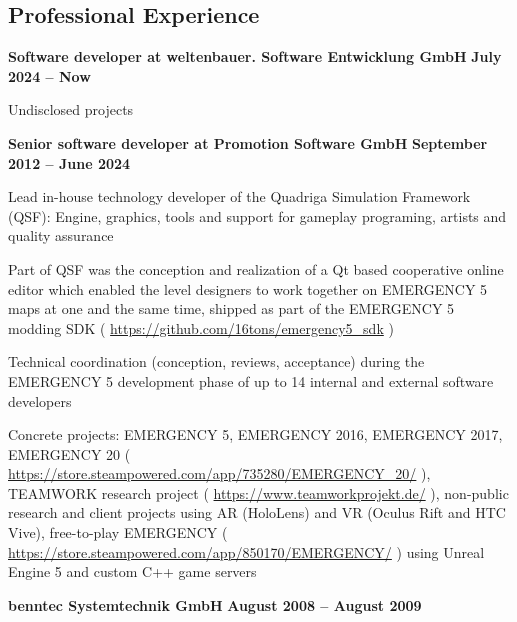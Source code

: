 \documentclass[margin,line]{Ofenberg_Resume}
\begin{document}
\begin{resume}
	\section{\mysidestyle Professional Experience}
	\textbf{Software developer at weltenbauer. Software Entwicklung GmbH} \hfill \textbf{July 2024 -- Now}\vspace{-3mm}\\\vspace{-1mm}%
	\begin{list2}
		\item Undisclosed projects
	\end{list2}\vspace{-1.5mm}
	\textbf{Senior software developer at Promotion Software GmbH} \hfill \textbf{September 2012 -- June 2024}\vspace{-3mm}\\\vspace{-1mm}%
	\begin{list2}
		\item Lead in-house technology developer of the Quadriga Simulation Framework (QSF): Engine, graphics, tools and support for gameplay programing, artists and quality assurance
		\item Part of QSF was the conception and realization of a Qt based cooperative online editor which enabled the level designers to work together on EMERGENCY 5 maps at one and the same time, shipped as part of the EMERGENCY 5 modding SDK ( \url{https://github.com/16tons/emergency5_sdk} )
		\item Technical coordination (conception, reviews, acceptance) during the EMERGENCY 5 development phase of up to 14 internal and external software developers
		\item Concrete projects: EMERGENCY 5, EMERGENCY 2016, EMERGENCY 2017, EMERGENCY 20 ( \url{https://store.steampowered.com/app/735280/EMERGENCY_20/} ), TEAMWORK research project ( \url{https://www.teamworkprojekt.de/} ), non-public research and client projects using AR (HoloLens) and VR (Oculus Rift and HTC Vive), free-to-play EMERGENCY ( \url{https://store.steampowered.com/app/850170/EMERGENCY/} ) using Unreal Engine 5 and custom C++ game servers
	\end{list2}\vspace{-1.5mm}
	\textbf{benntec Systemtechnik GmbH} \hfill \textbf{August 2008 -- August 2009}\vspace{-3mm}\\\vspace{-1mm}%
	\begin{list2}

\end{list2}
\end{resume}
\end{document}
